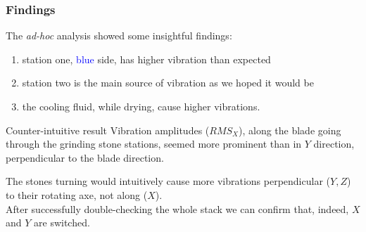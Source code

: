 \begin{frame}
    \frametitle{Findings}
    \vspace*{\fill}

    The \textit{ad-hoc} analysis showed some insightful findings:
    \begin{enumerate}
        \item station one, \textcolor{blue}{blue} side, has higher vibration than expected
        \item station two is the main source of vibration as we hoped it would be
        \item the cooling fluid, while drying, cause higher vibrations.
    \end{enumerate}

    \begin{alertblock}{Counter-intuitive result}
        Vibration amplitudes ($RMS_{X}$), along the blade going through the grinding stone stations, seemed more
        prominent than in $Y$ direction, perpendicular to the blade direction.
    \end{alertblock}

    The stones turning would intuitively cause
    more vibrations perpendicular ($Y, Z$) to their rotating axe, not along ($X$).\\
    After successfully double-checking the whole stack we can confirm that, indeed, $X$ and $Y$ are  switched.
    \vspace*{\fill}
\end{frame}